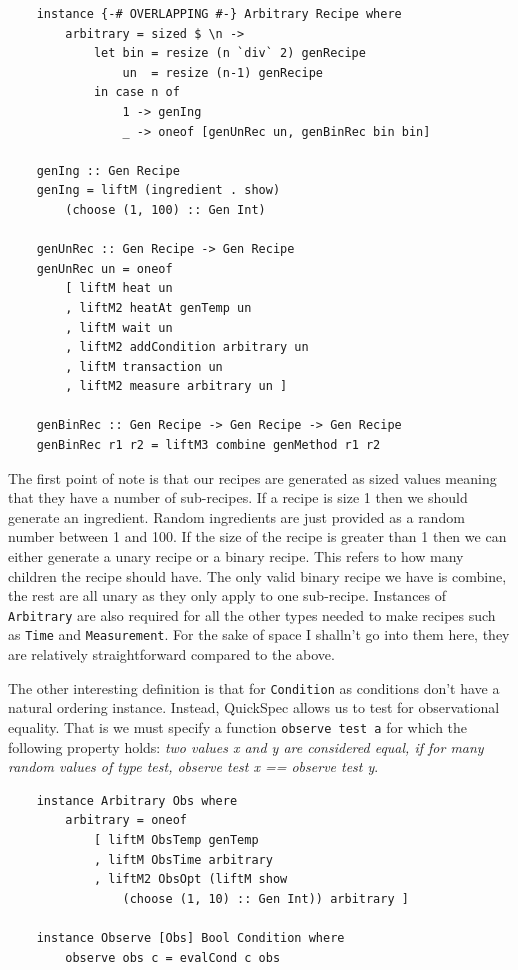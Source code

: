 \documentclass[11pt]{article}
\begin{document}
\begin{lstlisting}
    instance {-# OVERLAPPING #-} Arbitrary Recipe where
        arbitrary = sized $ \n ->
            let bin = resize (n `div` 2) genRecipe
                un  = resize (n-1) genRecipe
            in case n of
                1 -> genIng
                _ -> oneof [genUnRec un, genBinRec bin bin]

    genIng :: Gen Recipe
    genIng = liftM (ingredient . show)
        (choose (1, 100) :: Gen Int)

    genUnRec :: Gen Recipe -> Gen Recipe
    genUnRec un = oneof
        [ liftM heat un
        , liftM2 heatAt genTemp un
        , liftM wait un
        , liftM2 addCondition arbitrary un
        , liftM transaction un
        , liftM2 measure arbitrary un ]

    genBinRec :: Gen Recipe -> Gen Recipe -> Gen Recipe
    genBinRec r1 r2 = liftM3 combine genMethod r1 r2
\end{lstlisting}

The first point of note is that our recipes are generated as sized values meaning
that they have a number of sub-recipes. If a recipe is size 1 then we should generate
an ingredient. Random ingredients are just provided as a random number between 1 and 100.
If the size of the recipe is greater than 1 then we can either generate a unary recipe
or a binary recipe. This refers to how many children the recipe should have. The only
valid binary recipe we have is combine, the rest are all unary as they only apply to
one sub-recipe. Instances of \texttt{Arbitrary} are also required for all the other types
needed to make recipes such as \texttt{Time} and \texttt{Measurement}. For the sake
of space I shalln't go into them here, they are relatively straightforward compared to
the above.

\medbreak

The other interesting definition is that for \texttt{Condition} as conditions don't
have a natural ordering instance. Instead, QuickSpec allows us to test for observational
equality. That is we must specify a function \texttt{observe test a} for which the
following property holds: \textit{two values x and y are considered equal,
if for many random values of type test, observe test x == observe test y}.

\begin{lstlisting}
    instance Arbitrary Obs where
        arbitrary = oneof
            [ liftM ObsTemp genTemp
            , liftM ObsTime arbitrary
            , liftM2 ObsOpt (liftM show
                (choose (1, 10) :: Gen Int)) arbitrary ]

    instance Observe [Obs] Bool Condition where
        observe obs c = evalCond c obs
\end{lstlisting}
\end{document}
